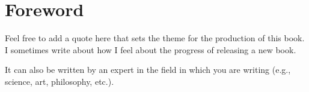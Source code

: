 

\chapter{Foreword}
\label{foreword:cha}

\begin{myquotation}
Feel free to add a quote here that sets the theme for the production of this book. I sometimes write about how I feel about the progress of releasing a new book.\end{myquotation}

It can also be written by an expert in the field in which you are writing (e.g., science, art, philosophy, etc.).

\hfil{}\hfil
